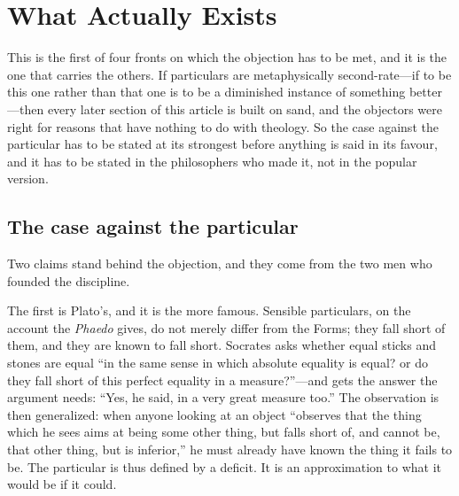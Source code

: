 \section{What Actually Exists}

This is the first of four fronts on which the objection has to be met, and it is the one that carries the others. If particulars are metaphysically second-rate---if to be this one rather than that one is to be a diminished instance of something better---then every later section of this article is built on sand, and the objectors were right for reasons that have nothing to do with theology. So the case against the particular has to be stated at its strongest before anything is said in its favour, and it has to be stated in the philosophers who made it, not in the popular version.

\subsection{The case against the particular}

Two claims stand behind the objection, and they come from the two men who founded the discipline.

The first is Plato's, and it is the more famous. Sensible particulars, on the account the \emph{Phaedo} gives, do not merely differ from the Forms; they fall short of them, and they are known to fall short. Socrates asks whether equal sticks and stones are equal ``in the same sense in which absolute equality is equal? or do they fall short of this perfect equality in a measure?''---and gets the answer the argument needs: ``Yes, he said, in a very great measure too.'' The observation is then generalized: when anyone looking at an object ``observes that the thing which he sees aims at being some other thing, but falls short of, and cannot be, that other thing, but is inferior,'' he must already have known the thing it fails to be. The particular is thus defined by a deficit. It is an approximation to what it would be if it could.


